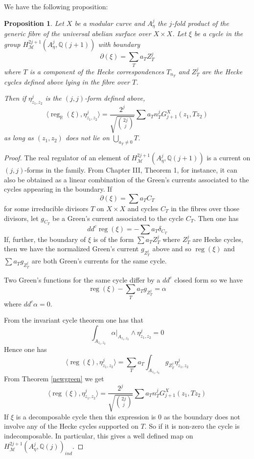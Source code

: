 \documentclass[11pt,a4paper]{article}
\newtheorem{prop}[defn]{Proposition}
\newcommand {\Q}{{\mathds Q}}
\newcommand {\R}{{\mathds R}}
\newcommand {\M}{{\mathcal M}}
\def\reg{\operatorname{reg}}
\begin{document}
We have the following proposition:




\begin{prop}
	Let $X$ be a modular curve and $A^j_{\eta}$ the $j$-fold product of the  generic fibre of the universal abelian surface over $X\times X$. Let $\xi$ be a cycle in the group $H^{2j+1}_{\M}(A^j_{\eta},\Q(j+1))$ with boundary 
	$$\partial(\xi)=\sum_T a_T Z^j_T$$
	where $T$ is a component of the Hecke correspondences $T_{n_T}$  and $Z^j_T$ are the Hecke cycles defined above lying in the fibre over $T$. 
	
	Then if $\eta^j_{z_1,z_2}$ is the $(j,j)$-form defined above, 
	$$\langle \reg_{\R}(\xi),\eta^j_{z_1,z_2}\rangle=  \frac{2^j}{\sqrt{\binom{2j}{j}}} \sum a_T n_T^j G_{j+1}^X(z_1, Tz_2)$$
	as long as $(z_1,z_2)$ does not lie on $\bigcup_{a_T \neq 0} T$.
	\label{reggreen}
	
\end{prop}


 
\begin{proof}
	The real regulator of an  element of $H^{2j+1}_{\M}(A^j_{\eta},\Q(j+1))$ is a current on  $(j,j)$-forms in the family. From \cite{soul} Chapter III, Theorem 1, for instance,  it can also be obtained as a linear combination of the Green's currents associated to the cycles appearing in the boundary. If 
	$$\partial(\xi)=\sum a_{T} C_{T}$$
	for some irreducible divisors  $T$ on $X \times X$  and cycles $C_{T}$ in the fibres over those divisors, let $g_{C_T}$ be a Green's current associated to the cycle $C_T$. Then one has 
	$$dd^c \reg(\xi)=-\sum a_T \delta_{C_T}$$
	If, further, the boundary of $\xi$ is of the form $\sum a_T Z^j_T$ where $Z^j_T$ are  Hecke cycles, then we have the normalized Green's current $g_{Z^j_T}$ above and so $\reg(\xi)$ and $\sum a_T g_{Z^j_T}$ are both Green's currents for the same cycle. 
	
	Two Green's functions for the same cycle differ by a $dd^c$ closed form so we have 
	$$\reg(\xi)-\sum_T a_T g_{Z^j_T}=\alpha$$
	where $dd^c \alpha=0$. 
	
	From the invariant cycle theorem one has that 
	$$\int_{A_{z_1,z_2}} \alpha|_{A_{z_1,z_2}} \wedge \eta^j_{z_1,z_2}=0$$
	Hence one has 		
	$$\langle \reg(\xi),\eta^j_{z_1,z_2} \rangle = \sum_T a_T \int_{A_{z_1,z_2}}  g_{Z^j_T}\eta^j_{z_1,z_2}  $$
	From  Theorem \ref{newgreen} we get 
	$$\langle \reg(\xi),\eta^j_{z_1,z_2}\rangle = \frac{2^j}{\sqrt{\binom{2j}{j}}} \sum a_T n_T^j G^X_{j+1}(z_1,T z_2)$$
	If $\xi$ is a decomposable cycle then this expression is $0$ as the boundary does not involve any of the Hecke cycles supported on $T$. So if it is non-zero the cycle is indecomposable. In particular, this gives a well defined map on $H^{2j+1}_{\M}(A^j_{\eta},\Q(j))_{ind}$.
	

\end{proof}
\end{document}
